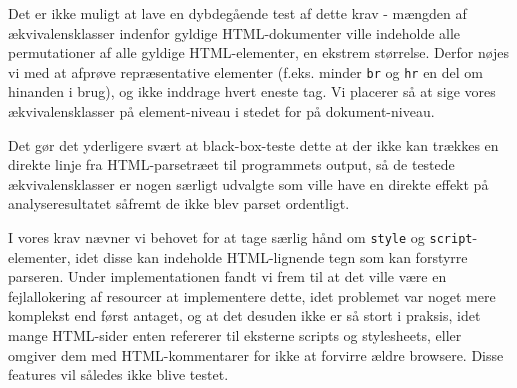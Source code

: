 \documentclass[a4paper,oneside,article]{memoir}
\begin{document}
Det er ikke muligt at lave en dybdegående test af dette krav - mængden
af ækvivalensklasser indenfor gyldige HTML-dokumenter ville indeholde
alle permutationer af alle gyldige HTML-elementer, en ekstrem
størrelse. Derfor nøjes vi med at afprøve repræsentative elementer
(f.eks. minder \texttt{br} og \texttt{hr} en del om hinanden i brug),
og ikke inddrage hvert eneste tag. Vi placerer så at sige vores
ækvivalensklasser på element-niveau i stedet for på dokument-niveau.

Det gør det yderligere svært at black-box-teste dette at der ikke kan
trækkes en direkte linje fra HTML-parsetræet til programmets output,
så de testede ækvivalensklasser er nogen særligt udvalgte som ville
have en direkte effekt på analyseresultatet såfremt de ikke blev
parset ordentligt.

I vores krav nævner vi behovet for at tage særlig hånd om
\texttt{style} og \texttt{script}-elementer, idet disse kan indeholde
HTML-lignende tegn som kan forstyrre parseren. Under implementationen
fandt vi frem til at det ville være en fejlallokering af resourcer at
implementere dette, idet problemet var noget mere komplekst end først
antaget, og at det desuden ikke er så stort i praksis, idet mange
HTML-sider enten refererer til eksterne scripts og stylesheets, eller
omgiver dem med HTML-kommentarer for ikke at forvirre ældre
browsere. Disse features vil således ikke blive testet.
\end{document}
